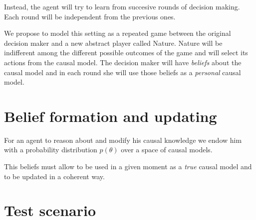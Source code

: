 \documentclass{article}
\begin{document}
Instead, the agent will try to learn from succesive rounds of decision making. Each round will be independent from the previous ones.

We propose to model this setting as a repeated game between the original decision maker and a new abstract player called Nature. Nature will be indifferent among the different possible outcomes of the game and will select its actions from the causal model. The decision maker will have \textit{beliefs} about the causal model and in each round she will use those beliefs as a \textit{personal} causal model. 

\section{Belief formation and updating}
For an agent to reason about and modify his causal knowledge we endow him with a probability distribution $p(\theta)$ over a space of causal models.

This beliefs must allow to be used in a given moment as a \textit{true} causal model and to be updated in a coherent way.
\section{Test scenario}
 


\end{document}
